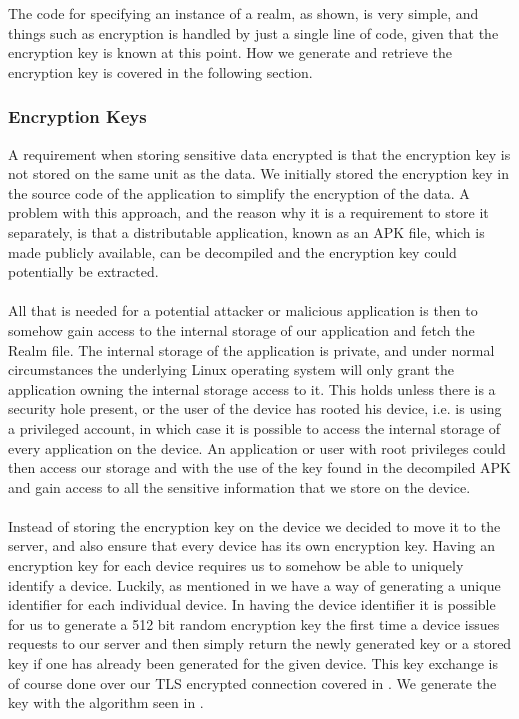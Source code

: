 
\FloatBarrier

The code for specifying an instance of a realm, as shown, is very simple, and things such as encryption is handled by just a single line of code, given that the encryption key is known at this point. How we generate and retrieve the encryption key is covered in the following section.

\subsubsection{Encryption Keys}
\label{sub:encryption_keys}
A requirement when storing sensitive data encrypted is that the encryption key is not stored on the same unit as the data. We initially stored the encryption key in the source code of the application to simplify the encryption of the data. A problem with this approach, and the reason why it is a requirement to store it separately, is that a distributable application, known as an APK file, which is made publicly available, can be decompiled and the encryption key could potentially be extracted. 
\\\\
All that is needed for a potential attacker or malicious application is then to somehow gain access to the internal storage of our application and fetch the Realm file. The internal storage of the application is private, and under normal circumstances the underlying Linux operating system will only grant the application owning the internal storage access to it. This holds unless there is a security hole present, or the user of the device has rooted his device, i.e. is using a privileged account, in which case it is possible to access the internal storage of every application on the device. An application or user with root privileges could then access our storage and with the use of the key found in the decompiled APK and gain access to all the sensitive information that we store on the device.
\\\\
Instead of storing the encryption key on the device we decided to move it to the server, and also ensure that every device has its own encryption key. Having an encryption key for each device requires us to somehow be able to uniquely identify a device. Luckily, as mentioned in  we have a way of generating a unique identifier for each individual device. In having the device identifier it is possible for us to generate a 512 bit random encryption key the first time a device issues requests to our server and then simply return the newly generated key or a stored key if one has already been generated for the given device. This key exchange is of course done over our TLS encrypted connection covered in . We generate the key with the algorithm seen in . 

